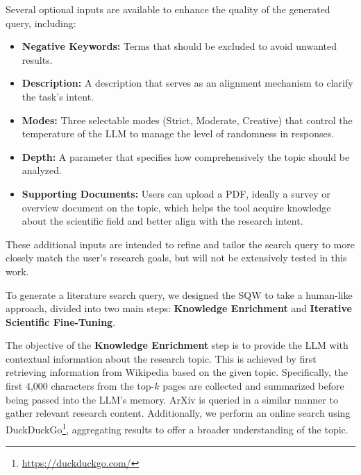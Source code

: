 Several optional inputs are available to enhance the quality of the generated query, including:
\begin{itemize}
	
\item \textbf{Negative Keywords:} Terms that should be excluded to avoid unwanted results.
\item \textbf{Description:} A description that serves as an alignment mechanism to clarify the task’s intent.
\item \textbf{Modes:} Three selectable modes (Strict, Moderate, Creative) that control the temperature of the LLM to manage the level of randomness in responses.
\item \textbf{Depth:} A parameter that specifies how comprehensively the topic should be analyzed.
\item \textbf{Supporting Documents:} Users can upload a PDF, ideally a survey or overview document on the topic, which helps the tool acquire knowledge about the scientific field and better align with the research intent.

\end{itemize}
These additional inputs are intended to refine and tailor the search query to more closely match the user's research goals, but will not be extensively tested in this work.

To generate a literature search query, we designed the SQW to take a human-like approach, divided into two main steps: \textbf{Knowledge Enrichment} and \textbf{Iterative Scientific Fine-Tuning}.

The objective of the \textbf{Knowledge Enrichment} step is to provide the LLM with contextual information about the research topic. This is achieved by first retrieving information from Wikipedia based on the given topic. Specifically, the first 4,000 characters from the top-\( k \) pages are collected and summarized before being passed into the LLM's memory. ArXiv is queried in a similar manner to gather relevant research content. Additionally, we perform an online search using DuckDuckGo\footnote{\url{https://duckduckgo.com/}}, aggregating results to offer a broader understanding of the topic.

